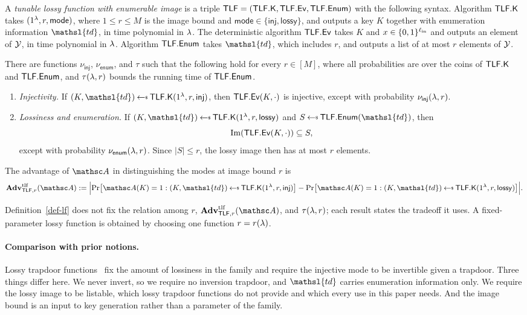 \begin{definition} \label{def-lf}
A \emph{tunable lossy function with enumerable image} is a triple $\mathsf{TLF}=(\mathsf{TLF}.\mathsf{K},\mathsf{TLF}.\mathsf{Ev},\mathsf{TLF}.\mathsf{Enum})$ with the following syntax. Algorithm $\mathsf{TLF}.\mathsf{K}$ takes $(1^{\lambda},r,\mathsf{mode})$, where $1\le r\le M$ is the image bound and $\mathsf{mode}\in\{\mathsf{inj},\mathsf{lossy}\}$, and outputs a key $K$ together with enumeration information $\mathsl{td}$, in time polynomial in $\lambda$. The deterministic algorithm $\mathsf{TLF}.\mathsf{Ev}$ takes $K$ and $x\in\{0,1\}^{\ell_{\mathrm{in}}}$ and outputs an element of $\mathcal{Y}$, in time polynomial in $\lambda$. Algorithm $\mathsf{TLF}.\mathsf{Enum}$ takes $\mathsl{td}$, which includes $r$, and outputs a list of at most $r$ elements of $\mathcal{Y}$.

There are functions $\nu_{\mathsf{inj}}$, $\nu_{\mathsf{enum}}$, and $\tau$ such that the following hold for every $r\in[M]$, where all probabilities are over the coins of $\mathsf{TLF}.\mathsf{K}$ and $\mathsf{TLF}.\mathsf{Enum}$, and $\tau(\lambda,r)$ bounds the running time of $\mathsf{TLF}.\mathsf{Enum}$.
\begin{enumerate}
\item \emph{Injectivity.} If $(K,\mathsl{td})\getsr\TLFKg(\usecp,r,\mathsf{inj})$, then $\mathsf{TLF}.\mathsf{Ev}(K,\cdot)$ is injective, except with probability $\nu_{\mathsf{inj}}(\lambda,r)$.
\item \emph{Lossiness and enumeration.} If $(K,\mathsl{td})\getsr\TLFKg(\usecp,r,\mathsf{lossy})$ and $S\getsr\TLFEnum(\mathsl{td})$, then
$$
\mathrm{Im}(\mathsf{TLF}.\mathsf{Ev}(K,\cdot))\subseteq S ,
$$
except with probability $\nu_{\mathsf{enum}}(\lambda,r)$. Since $|S|\le r$, the lossy image then has at most $r$ elements.
\end{enumerate}
The advantage of $\advA$ in distinguishing the modes at image bound $r$ is
$$
\AdvTLF{\TLF,r}{\advA}
:=
\Bigl|
\Pr\bigl[\advA(K)=1:(K,\mathsl{td})\getsr\TLFKg(\usecp,r,\mathsf{inj})\bigr]
-
\Pr\bigl[\advA(K)=1:(K,\mathsl{td})\getsr\TLFKg(\usecp,r,\mathsf{lossy})\bigr]
\Bigr| .
$$
\end{definition}

Definition~\ref{def-lf} does not fix the relation among $r$, $\AdvTLF{\TLF,r}{\advA}$, and $\tau(\lambda,r)$; each result states the tradeoff it uses. A fixed-parameter lossy function is obtained by choosing one function $r=r(\lambda)$.

\paragraph*{Comparison with prior notions.}
Lossy trapdoor functions~\cite{STOC:PeiWat08} fix the amount of lossiness in the
family and require the injective mode to be invertible given a trapdoor. Three
things differ here. We never invert, so we require no inversion trapdoor, and
$\mathsl{td}$ carries enumeration information only. We require the lossy image to
be listable, which lossy trapdoor functions do not provide and which every use in
this paper needs. And the image bound is an input to key generation rather than a
parameter of the family.

